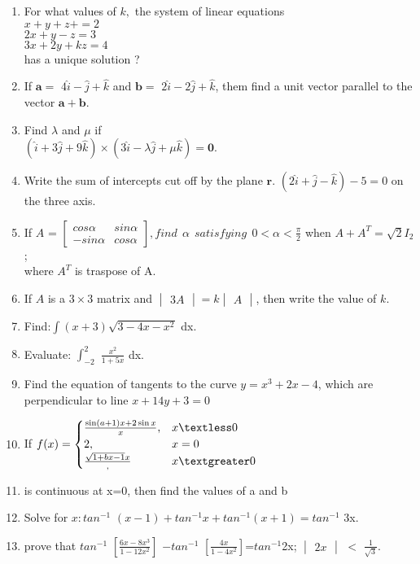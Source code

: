 \documentclass[12pt,-letter paper]{article}
\let\vec\mathbf{}
\let\vec\mathbf{}
\let\vec\mathbf{}
\providecommand{\mydet}[1]{\ensuremath{\begin{vmatrix}#1\end{vmatrix}}}
\providecommand{\myvec}[1]{\ensuremath{\begin{bmatrix}#1\end{bmatrix}}}
\providecommand{\brak}[1]{\ensuremath{\left(#1\right)}}
\begin{document}
\begin{enumerate}
	\item  For what values of $ k, $ the system of linear equations \\
       $ x+y+z+=2 $ \\
       $ 2x+y-z=3 $ \\
       $ 3x+2y+kz=4 $ \\
       has a unique solution ?      
\item If $\vec{a}=$ $4\hat{i}-\hat{j}+\hat{k}$ and $\vec{b}=$ $2\hat{i}-2\hat{j}+\hat{k}$, them find a unit vector parallel to the vector $\vec{a}+\vec{b}.$
\item Find $\lambda$ and $\mu$ if \\
	$\brak{\hat{i}+3\hat{j}+9\hat{k}}\times\brak{3\hat{i}-\lambda\hat{j}+\mu\hat{k}}=\vec{0}$.
\item Write the sum of intercepts cut off by the plane $\vec{r}$. $\brak{2\hat{i}+\hat{j}-\hat{k}}-5=0$ on the three axis.
\item If $A$ = $\myvec{cos \alpha & sin \alpha \\ -sin \alpha & cos \alpha}, find\ \ \alpha\ \ satisfying\ \ 0< \alpha < \frac{\pi}{2}$ when $A+A^{T}=\sqrt{2}I_{2}$; \\ where $A^{T}$ is traspose of A.
\item If $A$ is a $3\times3$ matrix and $\mydet{3A}=k\mydet{A}$, then write the value of $k.$ 	
\item Find:$\int$\brak{x+3}$\sqrt{3-4x-x^2}$ dx.	
\item Evaluate: $\int_{-2}^{2}$ $\frac{x^2}{1+5x}$ dx.
\item Find the equation of tangents to the curve $y=x^3+2x-4$, which are perpendicular to line $x+14y+3=0 $
\item  If  $f(x)=
	\begin{cases}
		\frac{\sin\brak{a+1}x + 2\sin x}{x},& x\textless0 \\
		        2, &x = 0 \\
		\frac{\sqrt{1+bx-1}{x}}, & x\textgreater0
	\end{cases} $\\
\item is continuous at x=0, then find the values of a and b
\item Solve for $x:tan^{-1}$ $\brak{x-1}+tan^{-1}x+tan^{-1}\brak{x+1}=tan^{-1}$ 3x.
\item prove that $tan^{-1}$ $[\frac{6x-8x^3}{1-12x^2}]$
$-tan^{-1}$ $[\frac{4x}{1-4x^2}]$=$tan^{-1}$2x; $\mydet{2x}$ $<$ $\frac{1}{\sqrt{3}}.$

\end{enumerate}
\end{document}
